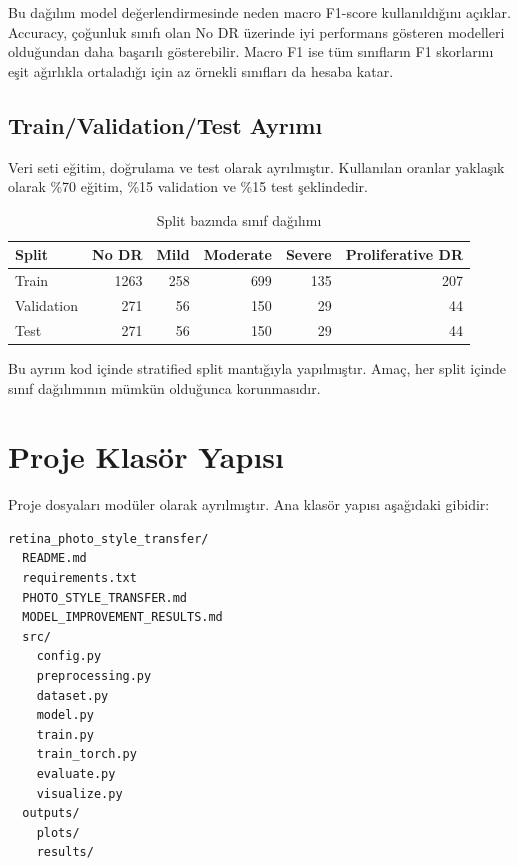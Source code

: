 \documentclass[12pt,a4paper]{article}
\begin{document}
Bu dağılım model değerlendirmesinde neden macro F1-score kullanıldığını açıklar. Accuracy, çoğunluk sınıfı olan No DR üzerinde iyi performans gösteren modelleri olduğundan daha başarılı gösterebilir. Macro F1 ise tüm sınıfların F1 skorlarını eşit ağırlıkla ortaladığı için az örnekli sınıfları da hesaba katar.

\subsection{Train/Validation/Test Ayrımı}

Veri seti eğitim, doğrulama ve test olarak ayrılmıştır. Kullanılan oranlar yaklaşık olarak \%70 eğitim, \%15 validation ve \%15 test şeklindedir.

\begin{table}[H]
\centering
\caption{Split bazında sınıf dağılımı}
\begin{tabular}{lrrrrr}
\toprule
\textbf{Split} & \textbf{No DR} & \textbf{Mild} & \textbf{Moderate} & \textbf{Severe} & \textbf{Proliferative DR} \\
\midrule
Train & 1263 & 258 & 699 & 135 & 207 \\
Validation & 271 & 56 & 150 & 29 & 44 \\
Test & 271 & 56 & 150 & 29 & 44 \\
\bottomrule
\end{tabular}
\end{table}

Bu ayrım kod içinde stratified split mantığıyla yapılmıştır. Amaç, her split içinde sınıf dağılımının mümkün olduğunca korunmasıdır.

\section{Proje Klasör Yapısı}

Proje dosyaları modüler olarak ayrılmıştır. Ana klasör yapısı aşağıdaki gibidir:

\begin{verbatim}
retina_photo_style_transfer/
  README.md
  requirements.txt
  PHOTO_STYLE_TRANSFER.md
  MODEL_IMPROVEMENT_RESULTS.md
  src/
    config.py
    preprocessing.py
    dataset.py
    model.py
    train.py
    train_torch.py
    evaluate.py
    visualize.py
  outputs/
    plots/
    results/
\end{verbatim}
\end{document}
